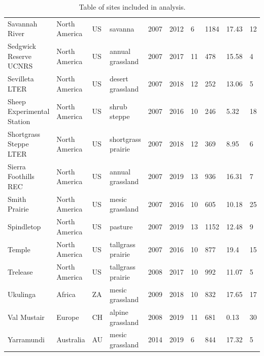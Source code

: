 \documentclass[twoside,12pt,final]{ucthesis-CA2012}
\begin{document}
\begin{ucmainmatter}
\begin{table}[ht]
{\begin{tabular}{llllllllll}
  Savannah River & North America & US & savanna & 2007 & 2012 & 6 & 1184 & 17.43 & 12 \\ 
  Sedgwick Reserve UCNRS & North America & US & annual grassland & 2007 & 2017 & 11 & 478 & 15.58 & 4 \\ 
  Sevilleta LTER & North America & US & desert grassland & 2007 & 2018 & 12 & 252 & 13.06 & 5 \\ 
  Sheep Experimental Station & North America & US & shrub steppe & 2007 & 2016 & 10 & 246 & 5.32 & 18 \\ 
  Shortgrass Steppe LTER & North America & US & shortgrass prairie & 2007 & 2018 & 12 & 369 & 8.95 & 6 \\ 
  Sierra Foothills REC & North America & US & annual grassland & 2007 & 2019 & 13 & 936 & 16.31 & 7 \\ 
  Smith Prairie & North America & US & mesic grassland & 2007 & 2016 & 10 & 605 & 10.18 & 25 \\ 
  Spindletop & North America & US & pasture & 2007 & 2019 & 13 & 1152 & 12.48 & 9 \\ 
  Temple & North America & US & tallgrass prairie & 2007 & 2016 & 10 & 877 & 19.4 & 15 \\ 
  Trelease & North America & US & tallgrass prairie & 2008 & 2017 & 10 & 992 & 11.07 & 5 \\ 
  Ukulinga & Africa & ZA & mesic grassland & 2009 & 2018 & 10 & 832 & 17.65 & 17 \\ 
  Val Mustair & Europe & CH & alpine grassland & 2008 & 2019 & 11 & 681 & 0.13 & 30 \\ 
  Yarramundi & Australia & AU & mesic grassland & 2014 & 2019 & 6 & 844 & 17.32 & 5 \\ 
   \hline
\end{tabular}
}
\caption{Table of sites included in analysis.} 
\end{table}
\begin{table}[ht]
\centering
{}
\end{table}
\end{ucmainmatter}
\end{document}
